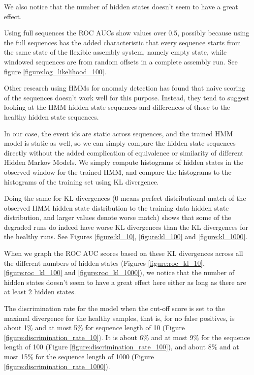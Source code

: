 \documentclass[journal]{IEEEtran}
\begin{document}
We also notice that the number of hidden states doesn't seem to have a great effect.

Using full sequences the ROC AUCs show values over 0.5, possibly because using the full sequences has the added characteristic that every sequence starts from the same state of the flexible assembly system, namely empty state, while windowed sequences are from random offsets in a complete assembly run. See figure \ref{figure:log_likelihood_100}.

Other research using HMMs for anomaly detection has found that naive scoring of the sequences doesn't work well for this purpose\cite{gornitz2015hidden}. Instead, they tend to suggest looking at the HMM hidden state sequences and differences of those to the healthy hidden state sequences.

In our case, the event ids are static across sequences, and the trained HMM model is static as well, so we can simply compare the hidden state sequences directly without the added complication of equivalence or similarity of different Hidden Markov Models. We simply compute histograms of hidden states in the observed window for the trained HMM, and compare the histograms to the histograms of the training set using KL divergence.

Doing the same for KL divergences (0 means perfect distributional match of the observed HMM hidden state distribution to the training data hidden state distribution, and larger values denote worse match) shows that some of the degraded runs do indeed have worse KL divergences than the KL divergences for the healthy runs. See Figures \ref{figure:kl_10}, \ref{figure:kl_100} and \ref{figure:kl_1000}.

When we graph the ROC AUC scores based on these KL divergences across all the different numbers of hidden states (Figures \ref{figure:roc_kl_10}, \ref{figure:roc_kl_100} and \ref{figure:roc_kl_1000}), we notice that the number of hidden states doesn't seem to have a great effect here either as long as there are at least 2 hidden states.

The discrimination rate for the model when the cut-off score is set to the maximal divergence for the healthy samples, that is, for no false positives, is about 1\% and at most 5\% for sequence length of 10 (Figure \ref{figure:discrimination_rate_10}). It is about 6\% and at most 9\% for the sequence length of 100 (Figure \ref{figure:discrimination_rate_100}), and about 8\% and at most 15\% for the sequence length of 1000 (Figure \ref{figure:discrimination_rate_1000}).
\end{document}
